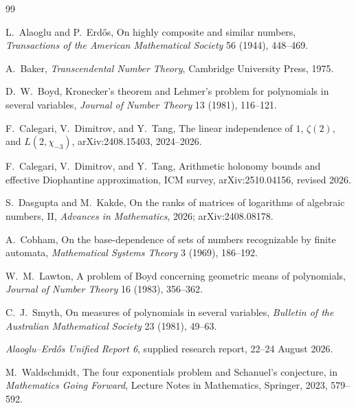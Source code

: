 \documentclass[11pt]{article}
\theoremstyle{definition}
\theoremstyle{remark}
\begin{document}
\begin{thebibliography}{99}

L.~Alaoglu and P.~Erd\H{o}s,
\newblock On highly composite and similar numbers,
\newblock \emph{Transactions of the American Mathematical Society} 56 (1944),
448--469.

A.~Baker,
\newblock \emph{Transcendental Number Theory},
\newblock Cambridge University Press, 1975.

D.~W.~Boyd,
\newblock Kronecker's theorem and Lehmer's problem for polynomials in several
variables,
\newblock \emph{Journal of Number Theory} 13 (1981), 116--121.

F.~Calegari, V.~Dimitrov, and Y.~Tang,
\newblock The linear independence of $1$, $\zeta(2)$, and
$L(2,\chi_{-3})$,
\newblock arXiv:2408.15403, 2024--2026.

F.~Calegari, V.~Dimitrov, and Y.~Tang,
\newblock Arithmetic holonomy bounds and effective Diophantine approximation,
\newblock ICM survey, arXiv:2510.04156, revised 2026.

S.~Dasgupta and M.~Kakde,
\newblock On the ranks of matrices of logarithms of algebraic numbers, II,
\newblock \emph{Advances in Mathematics}, 2026; arXiv:2408.08178.

A.~Cobham,
\newblock On the base-dependence of sets of numbers recognizable by finite automata,
\newblock \emph{Mathematical Systems Theory} 3 (1969), 186--192.

W.~M.~Lawton,
\newblock A problem of Boyd concerning geometric means of polynomials,
\newblock \emph{Journal of Number Theory} 16 (1983), 356--362.

C.~J.~Smyth,
\newblock On measures of polynomials in several variables,
\newblock \emph{Bulletin of the Australian Mathematical Society} 23 (1981),
49--63.

\emph{Alaoglu--Erd\H{o}s Unified Report 6},
\newblock supplied research report, 22--24 August 2026.

M.~Waldschmidt,
\newblock The four exponentials problem and Schanuel's conjecture,
\newblock in \emph{Mathematics Going Forward}, Lecture Notes in Mathematics,
Springer, 2023, 579--592.

\end{thebibliography}
\end{document}
